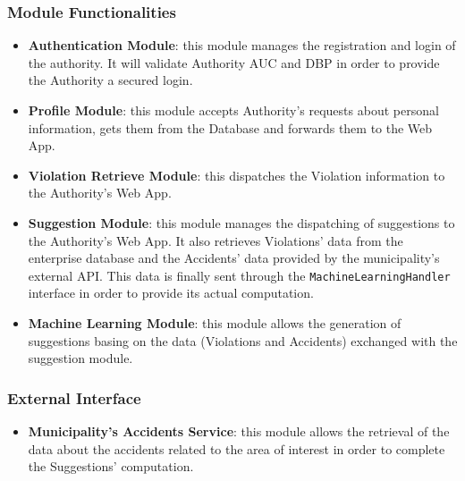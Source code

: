 \documentclass[12pt,a4paper]{article}
\begin{document}
\subsubsection*{Module Functionalities}
\begin{itemize}
\item \textbf{Authentication Module}: this module manages the registration and login of the authority. It will validate Authority AUC and DBP in order to provide the Authority a secured login.
\item \textbf{Profile Module}: this module accepts Authority's requests about personal information, gets them from the Database and forwards them to the Web App.
\item \textbf{Violation Retrieve Module}: this dispatches the Violation information to the Authority's Web App.
\item \textbf{Suggestion Module}: this module manages the dispatching of suggestions to the Authority's Web App. It also retrieves Violations' data from the enterprise database and the Accidents' data provided by the municipality's external API. This data is finally sent through the \texttt{MachineLearningHandler} interface in order to provide its actual computation.
\item \textbf{Machine Learning Module}: this module allows the generation of suggestions basing on the data (Violations and Accidents) exchanged with the suggestion module.
\end{itemize}
\subsubsection*{External Interface}
\begin{itemize}
\item \textbf{Municipality's Accidents Service}: this module allows the retrieval of the data about the accidents related to the area of interest in order to complete the Suggestions' computation.
\end{itemize}
\end{document}
